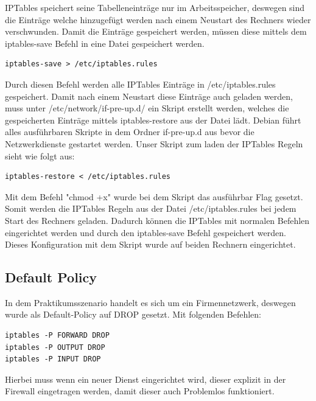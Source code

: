 IPTables speichert seine Tabelleneinträge nur im Arbeitsspeicher, deswegen sind die Einträge welche hinzugefügt werden nach einem Neustart des Rechners wieder verschwunden. Damit die Einträge gespeichert werden, müssen diese mittels dem iptables-save Befehl in eine Datei gespeichert werden. 
\begin{lstlisting}
iptables-save > /etc/iptables.rules
\end{lstlisting}
Durch diesen Befehl werden alle IPTables Einträge in /etc/iptables.rules gespeichert. Damit nach einem Neustart diese Einträge auch geladen werden, muss unter /etc/network/if-pre-up.d/ ein Skript erstellt werden, welches die gespeicherten Einträge mittels iptables-restore aus der Datei lädt. Debian führt alles ausführbaren Skripte in dem Ordner if-pre-up.d aus bevor die Netzwerkdienste gestartet werden. Unser Skript zum laden der IPTables Regeln sieht wie folgt aus:
\begin{lstlisting}[caption={/etc/network/if-pre-up.d/iptables}]
iptables-restore < /etc/iptables.rules
\end{lstlisting}
Mit dem Befehl "chmod +x" wurde bei dem Skript das ausführbar Flag gesetzt. Somit werden die IPTables Regeln aus der Datei /etc/iptables.rules bei jedem Start des Rechners geladen. Dadurch können die IPTables mit normalen Befehlen eingerichtet werden und durch den iptables-save Befehl gespeichert werden. Dieses Konfiguration mit dem Skript wurde auf beiden Rechnern eingerichtet.

\subsection{Default Policy}
In dem Praktikumsszenario handelt es sich um ein Firmennetzwerk, deswegen wurde als Default-Policy auf DROP gesetzt. Mit folgenden Befehlen:
\begin{lstlisting}[caption={Befehle für Default Policy}]
iptables -P FORWARD DROP
iptables -P OUTPUT DROP
iptables -P INPUT DROP
\end{lstlisting}
Hierbei muss wenn ein neuer Dienst eingerichtet wird, dieser explizit in der Firewall eingetragen werden, damit dieser auch Problemlos funktioniert.

